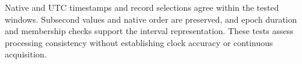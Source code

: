 Native and UTC timestamps and record selections agree within the tested windows. Subsecond values and native order are preserved, and epoch duration and membership checks support the interval representation. These tests assess processing consistency without establishing clock accuracy or continuous acquisition.
